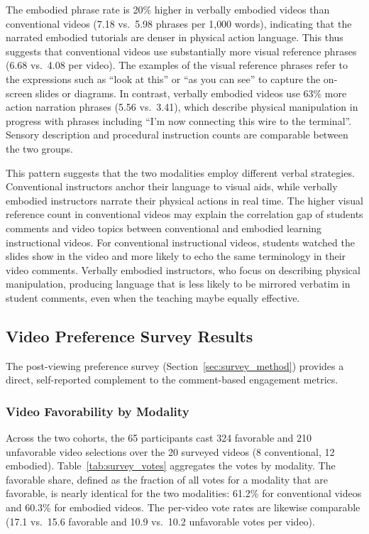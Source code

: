 \documentclass[fleqn,10pt]{JLA_article} %
\begin{document}
The embodied phrase rate is 20\% higher in verbally embodied videos than conventional videos (7.18 vs.\ 5.98 phrases per 1{,}000 words), indicating that the narrated embodied tutorials are denser in physical action language. This thus suggests that conventional videos use substantially more visual reference phrases (6.68 vs.\ 4.08 per video). The examples of the visual reference phrases refer to the expressions such as ``look at this'' or ``as you can see'' to capture the on-screen slides or diagrams. In contrast, verbally embodied videos use 63\% more action narration phrases (5.56 vs.\ 3.41), which describe physical manipulation in progress with phrases including ``I'm now connecting this wire to the terminal''. Sensory description and procedural instruction counts are comparable between the two groups.

This pattern suggests that the two modalities employ different verbal strategies. Conventional instructors anchor their language to visual aids, while verbally embodied instructors narrate their physical actions in real time. The higher visual reference count in conventional videos may explain the correlation gap of students comments and video topics between conventional and embodied learning instructional videos. For conventional instructional videos, students watched the slides show in the video and more likely to echo the same terminology in their video comments. Verbally embodied instructors, who focus on describing physical manipulation, producing language that is less likely to be mirrored verbatim in student comments, even when the teaching maybe equally effective.

\subsection{Video Preference Survey Results}
\label{sec:survey_results}

The post-viewing preference survey (Section~\ref{sec:survey_method}) provides a direct, self-reported complement to the comment-based engagement metrics.

\subsubsection{Video Favorability by Modality}
Across the two cohorts, the 65 participants cast 324 favorable and 210 unfavorable video selections over the 20 surveyed videos (8 conventional, 12 embodied). Table~\ref{tab:survey_votes} aggregates the votes by modality. The favorable share, defined as the fraction of all votes for a modality that are favorable, is nearly identical for the two modalities: 61.2\% for conventional videos and 60.3\% for embodied videos. The per-video vote rates are likewise comparable (17.1 vs.\ 15.6 favorable and 10.9 vs.\ 10.2 unfavorable votes per video).
\end{document}
